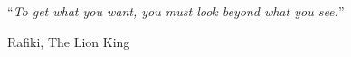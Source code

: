 %
\begin{epigrafe}
  		``\textit{To get what you want, you must look beyond what you see.}''
  		
  		
Rafiki, The Lion King
\end{epigrafe}
